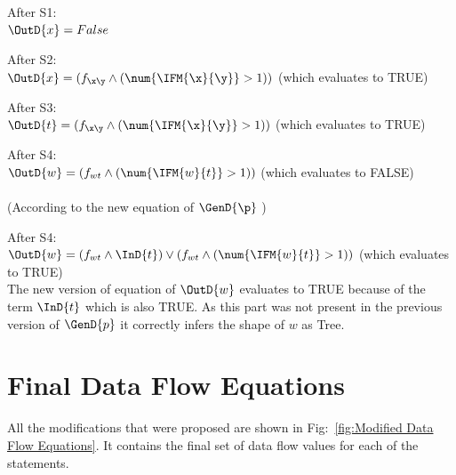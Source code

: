 After S1: \\
$\OutD{x} = False$

After S2: \\
$\OutD{x} =  ( f_{\x\y} \wedge (\num{\IFM{\x}{\y}} > 1) )$
(which evaluates to TRUE)

After S3: \\
$\OutD{t} = ( f_{\x\y} \wedge (\num{\IFM{\x}{\y}} > 1) )$
(which evaluates to TRUE)

After S4:\\
$\OutD{w} = ( f_{wt} \wedge (\num{\IFM{w}{t}} > 1) )$ 
(which evaluates to FALSE) \\ \\
(According to the new equation of $\GenD{\p}$ )

After S4: \\
$\OutD{w} =   (f_{wt} \wedge \InD{t}) \vee ( f_{wt} \wedge (\num{\IFM{w}{t}} > 1) )$
(which evaluates to TRUE) \\

The new version of equation of $\OutD{w}$ evaluates to TRUE because of the term $\InD{t}$ which is also TRUE. As this part
was not present in the previous version of $\GenD{p}$ it correctly infers the shape of $w$ as Tree.

\section{Final Data Flow Equations}
All the modifications that were proposed are shown in  Fig:~\ref{fig:Modified Data Flow Equations}. It contains the 
final set of data flow values for each of the statements.


